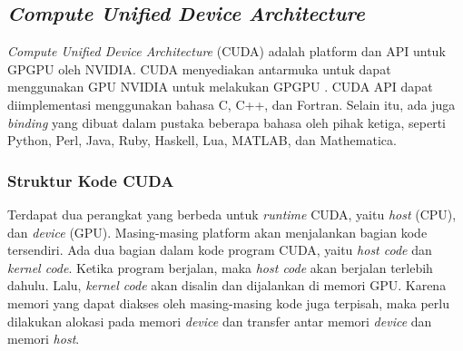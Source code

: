   
  
  
  \subsection{\emph{Compute Unified Device Architecture}}
  
    \emph{Compute Unified Device Architecture} (CUDA) adalah platform dan API untuk GPGPU oleh NVIDIA. CUDA menyediakan antarmuka untuk dapat menggunakan GPU NVIDIA untuk melakukan GPGPU \citep{cuda}. CUDA API dapat diimplementasi menggunakan bahasa C, C++, dan Fortran. Selain itu, ada juga \emph{binding} yang dibuat dalam pustaka beberapa bahasa oleh pihak ketiga, seperti Python, Perl, Java, Ruby, Haskell, Lua, MATLAB, dan Mathematica.
    
    \subsubsection{Struktur Kode CUDA}
    
      Terdapat dua perangkat yang berbeda untuk \emph{runtime} CUDA, yaitu \emph{host} (CPU), dan \emph{device} (GPU). Masing-masing platform akan menjalankan bagian kode tersendiri. Ada dua bagian dalam kode program CUDA, yaitu \emph{host code} dan \emph{kernel code}. Ketika program berjalan, maka \emph{host code} akan berjalan terlebih dahulu. Lalu, \emph{kernel code} akan disalin dan dijalankan di memori GPU. Karena memori yang dapat diakses oleh masing-masing kode juga terpisah, maka perlu dilakukan alokasi pada memori \emph{device} dan transfer antar memori \emph{device} dan memori \emph{host}.
    
